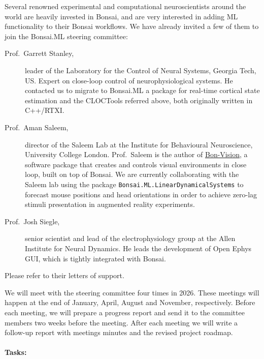 Several renowned experimental and computational neuroscientists around the
world are heavily invested in Bonsai, and are very interested in adding ML
functionality to their Bonsai workflows. We have already invited a few of them
to join the Bonsai.ML steering committee:

\begin{description}

    \item[Prof.~Garrett Stanley,] leader of the Laboratory for the Control of
        Neural Systems, Georgia Tech, US. Expert on close-loop control of
        neurophysiological systems. He contacted us to migrate to Bonsai.ML
        a package for real-time cortical state estimation and the CLOCTools
        referred above, both originally written in C++/RTXI.

    \item[Prof.~Aman Saleem,] director of the Saleem Lab at the Institute for
        Behavioural Neuroscience, University College London. Prof.~Saleem is the
        author of \href{https://bonvision.github.io/}{Bon-Vision}, a software
        package that creates and controls visual environments in close loop,
        built on top of Bonsai.
        We are currently collaborating with the Saleem lab using the package
        \texttt{Bonsai.ML.LinearDynamicalSystems} to forecast mouse positions
        and head orientations in order to achieve zero-lag stimuli presentation
        in augmented reality experiments.

    \item[Prof.~Josh Siegle,] senior scientist and lead of the
        electrophysiology group at the Allen Institute for Neural Dynamics. He
        leads the development of Open Ephys GUI, which is tightly integrated
        with Bonsai.

\end{description}

Please refer to their letters of support.

We will meet with the steering committee four times in 2026. These meetings
will happen at the end of January, April, August and November, respectively.
%
Before each meeting, we will prepare a progress report and send it to the
committee members two weeks before the meeting. After each meeting we will
write a follow-up report with meetings minutes and the revised project roadmap.

\paragraph{Tasks:}

